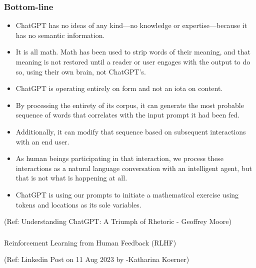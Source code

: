 \begin{frame}[fragile]\frametitle{Bottom-line}

\begin{itemize}
\item ChatGPT has no ideas of any kind—no knowledge or expertise—because it has no semantic information. 
\item It is all math. Math has been used to strip words of their meaning, and that meaning is not restored until a reader or user engages with the output to do so, using their own brain, not ChatGPT’s. 
\item ChatGPT is operating entirely on form and not an iota on content. 
\item By processing the entirety of its corpus, it can generate the most probable sequence of words that correlates with the input prompt it had been fed. 
\item Additionally, it can modify that sequence based on subsequent interactions with an end user. 
\item As human beings participating in that interaction, we process these interactions as a natural language conversation with an intelligent agent, but that is not what is happening at all. 
\item ChatGPT is using our prompts to initiate a mathematical exercise using tokens and locations as its sole variables. 
\end{itemize}


{\tiny (Ref: Understanding ChatGPT: A Triumph of Rhetoric - Geoffrey Moore)}

\end{frame}

\begin{frame}[fragile]\frametitle{}
\begin{center}
{\Large Reinforcement Learning from Human Feedback (RLHF)}

{\tiny (Ref: Linkedin Post on 11 Aug 2023 by -Katharina Koerner)}

\end{center}
\end{frame}

